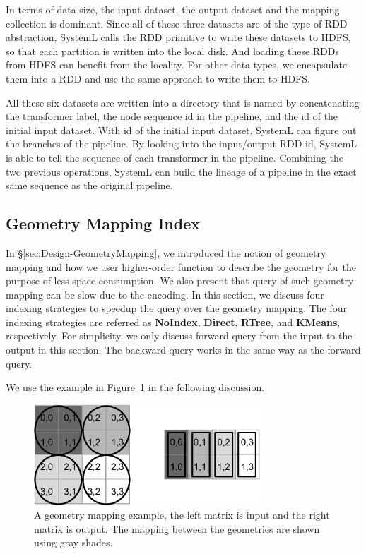 \documentclass{sig-alternate}
\begin{document}
In terms of data size, the input dataset, the output dataset and the mapping collection is dominant. 
Since all of these three datasets are of the type of RDD abstraction, SystemL calls the RDD primitive to write these datasets
to HDFS, so that each partition is written into the local disk. 
And loading these RDDs from HDFS can benefit from the locality.
For other data types, we encapsulate them into a RDD and use the same approach to write them to HDFS.

All these six datasets are written into a directory that is named by concatenating the transformer label, 
the node sequence id in the pipeline, and the id of the initial input dataset. 
With id of the initial input dataset, SystemL can figure out the branches of the pipeline.
By looking into the input/output RDD id, SystemL is able to tell the sequence of each transformer in the pipeline.
Combining the two previous operations, SystemL can build the lineage of a pipeline in the exact same sequence
as the original pipeline.

\subsection{Geometry Mapping Index}
\label{sec:GeometryIndex}
In \S\ref{sec:Design-GeometryMapping}, we introduced the notion of geometry mapping and how we user higher-order function
to describe the geometry for the purpose of less space consumption. We also present that query of such geometry mapping
can be slow due to the encoding. 
In this section, we discuss four indexing strategies to speedup the query over the geometry mapping. 
The four indexing strategies are referred as {\bf NoIndex}, {\bf Direct}, {\bf RTree}, and {\bf KMeans}, respectively.
For simplicity, we only discuss forward query from the input to the output in this section.
The backward query works in the same way as the forward query.


We use the example in Figure~\ref{fig:example} in the following discussion.
\begin{figure}[h]
\begin{center}
    \includegraphics[width=85mm]{pictures/example}
\caption {A geometry mapping example, the left matrix is input and the right matrix is output. The mapping between the geometries are shown using gray shades.
    \label{fig:example}
}
\end{center}
\end{figure}
\end{document}

